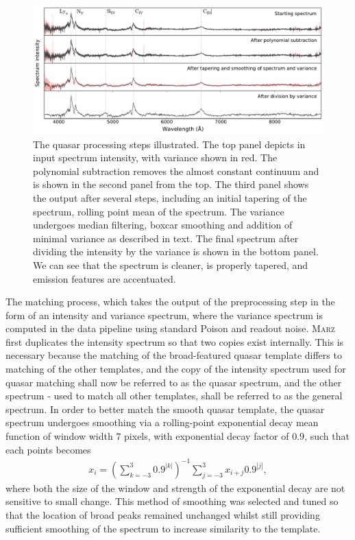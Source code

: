 \documentclass[iop]{emulateapj}
\newcommand{\marz}{\textsc{Marz}}
\begin{document}
\begin{figure}[t]
\centering
\includegraphics[width=\textwidth]{quasarProcess.pdf}
\caption{The quasar processing steps illustrated. The top panel depicts in input spectrum intensity, with variance shown in red. The polynomial subtraction removes the almost constant continuum and is shown in the second panel from the top. The third panel shows the output after several steps, including an initial tapering of the spectrum, rolling point mean of the spectrum. The variance undergoes median filtering, boxcar smoothing and addition of minimal variance as described in text. The final spectrum after dividing the intensity by the variance is shown in the bottom panel. We can see that the spectrum is cleaner, is properly tapered, and emission features are accentuated.}
\label{fig:quasarProcess}
\end{figure}







The matching process, which takes the output of the preprocessing step in the form of an intensity and variance spectrum, where the variance spectrum is computed in the data pipeline using standard Poison and readout noise. \marz{} first duplicates the intensity spectrum so that two copies exist internally. This is necessary because the matching of the broad-featured quasar template differs to matching of the other templates, and the copy of the intensity spectrum used for quasar matching shall now be referred to as the quasar spectrum, and the other spectrum - used to match all other templates, shall be referred to as the general spectrum. In order to better match the smooth quasar template, the quasar spectrum undergoes smoothing via a rolling-point exponential decay mean function of window width 7 pixels, with exponential decay factor of $0.9$, such that each points becomes
\begin{align}
x_i = \left( \sum_{k = -3}^3 0.9^{|k|}   \right)^{-1} \sum_{j = -3}^3 x_{i+j} 0.9^{|j|},
\end{align}
where both the size of the window and strength of the exponential decay are not sensitive to small change. This method of smoothing was selected and tuned so that the location of broad peaks remained unchanged whilst still providing sufficient smoothing of the spectrum to increase similarity to the template.\\
\end{document}
